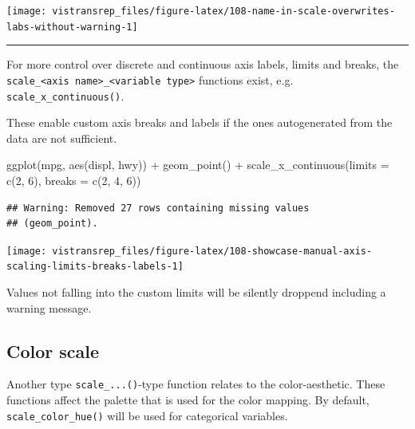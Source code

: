 \documentclass[]{book}
\newenvironment{Shaded}{}{}
\newcommand{\DataTypeTok}[1]{#1}
\newcommand{\DecValTok}[1]{#1}
\newcommand{\KeywordTok}[1]{\textcolor[rgb]{0.00,0.00,1.00}{#1}}
\newcommand{\NormalTok}[1]{#1}
\newcommand{\OperatorTok}[1]{#1}
\newcommand{\StringTok}[1]{\textcolor[rgb]{0.00,0.50,0.50}{#1}}
\begin{document}
\begin{flushright}\texttt{[image: vistransrep\_files/figure-latex/108-name-in-scale-overwrites-labs-without-warning-1]} \end{flushright}

\begin{center}\rule{0.5\linewidth}{\linethickness}\end{center}

For more control over discrete and continuous axis labels, limits and breaks, the \texttt{scale\_\textless{}axis\ name\textgreater{}\_\textless{}variable\ type\textgreater{}} functions exist, e.g. \texttt{scale\_x\_continuous()}.

These enable custom axis breaks and labels if the ones autogenerated from the data are not sufficient.

\begin{Shaded}
\begin{Highlighting}[]
\KeywordTok{ggplot}\NormalTok{(mpg, }\KeywordTok{aes}\NormalTok{(displ, hwy)) }\OperatorTok{+}
\StringTok{  }\KeywordTok{geom_point}\NormalTok{() }\OperatorTok{+}
\StringTok{  }\KeywordTok{scale_x_continuous}\NormalTok{(}\DataTypeTok{limits =} \KeywordTok{c}\NormalTok{(}\DecValTok{2}\NormalTok{, }\DecValTok{6}\NormalTok{), }\DataTypeTok{breaks =} \KeywordTok{c}\NormalTok{(}\DecValTok{2}\NormalTok{, }\DecValTok{4}\NormalTok{, }\DecValTok{6}\NormalTok{))}
\end{Highlighting}
\end{Shaded}

\begin{verbatim}
## Warning: Removed 27 rows containing missing values
## (geom_point).
\end{verbatim}

\begin{flushright}\texttt{[image: vistransrep\_files/figure-latex/108-showcase-manual-axis-scaling-limits-breaks-labels-1]} \end{flushright}

Values not falling into the custom limits will be silently droppend including a warning message.

\hypertarget{color-scale}{%
\subsection{Color scale}\label{color-scale}}

Another type \texttt{scale\_...()}-type function relates to the color-aesthetic.
These functions affect the palette that is used for the color mapping.
By default, \texttt{scale\_color\_hue()} will be used for categorical variables.
\end{document}
